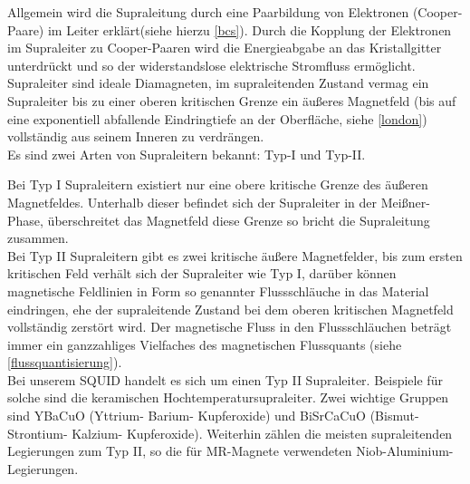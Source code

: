 \documentclass[12pt]{article}
\begin{document}
Allgemein wird die Supraleitung durch eine Paarbildung von Elektronen (Cooper-Paare) im Leiter erklärt(siehe hierzu \ref{bcs}).
 Durch die Kopplung der Elektronen im Supraleiter zu Cooper-Paaren wird die Energieabgabe an das Kristallgitter unterdrückt und so der widerstandslose elektrische Stromfluss ermöglicht. \\

Supraleiter sind ideale Diamagneten, im supraleitenden Zustand vermag ein Supraleiter bis zu einer oberen kritischen Grenze ein äußeres Magnetfeld (bis auf eine exponentiell abfallende Eindringtiefe an der Oberfläche, siehe \ref{london}) vollständig aus seinem Inneren zu verdrängen.\\

Es sind zwei Arten von Supraleitern bekannt: Typ-I und Typ-II.

Bei Typ I Supraleitern existiert nur eine obere kritische Grenze des äußeren Magnetfeldes. Unterhalb dieser befindet sich der Supraleiter in der Meißner-Phase, überschreitet das Magnetfeld diese Grenze so bricht die Supraleitung zusammen.\\

Bei Typ II Supraleitern gibt es zwei kritische äußere Magnetfelder, bis zum ersten kritischen Feld verhält sich der Supraleiter wie Typ I, darüber können magnetische Feldlinien in Form so genannter Flussschläuche in das Material eindringen, ehe der supraleitende Zustand bei dem oberen kritischen Magnetfeld vollständig zerstört wird. Der magnetische Fluss in den Flussschläuchen beträgt immer ein ganzzahliges Vielfaches des magnetischen Flussquants (siehe \ref{flussquantisierung}).\\

Bei unserem SQUID handelt es sich um einen Typ II Supraleiter. Beispiele für solche sind die keramischen Hochtemperatursupraleiter. Zwei wichtige Gruppen sind YBaCuO (Yttrium- Barium- Kupferoxide) und BiSrCaCuO (Bismut- Strontium- Kalzium- Kupferoxide). Weiterhin zählen die meisten supraleitenden Legierungen zum Typ II, so die für MR-Magnete verwendeten Niob-Aluminium-Legierungen.
\end{document}
